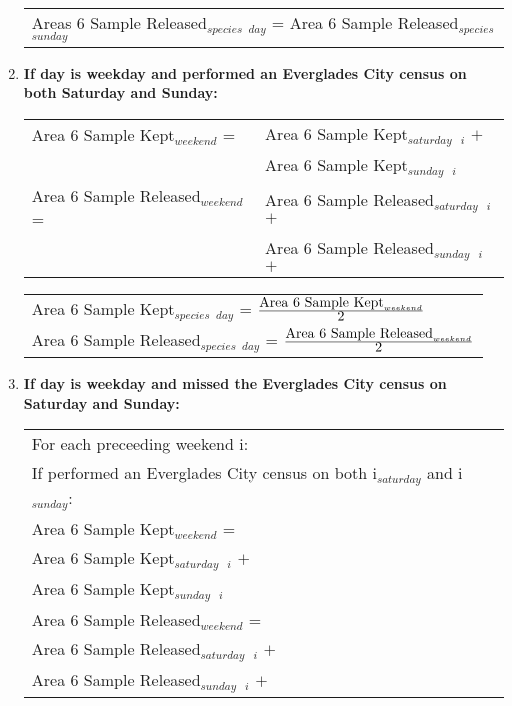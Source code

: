 \documentclass[letterpaper,12pt]{article}
\newcommand{\hspacer}{\hspace*{1cm}}
\newcommand{\fraction}[1]{\textrm{\normalsize{#1}}}
\begin{document}
\begin{enumerate}
\begin{tabular}{l@{ }}
	Areas 6 Sample Released$_{species}$ $_{day}$ =
		Area 6 Sample Released$_{species}$ $_{sunday}$
\end{tabular}

\item
\textbf{If day is weekday and performed an Everglades City census on both Saturday and Sunday:} \\
\begin{tabular}{l@{ }l@{ }}
	Area 6 Sample Kept$_{weekend}$ =
	& Area 6 Sample Kept$_{saturday}$\ $_{i}$ $+$ \\
	& Area 6 Sample Kept$_{sunday}$\ $_{i}$ \\

	Area 6 Sample Released$_{weekend}$ =
	& Area 6 Sample Released$_{saturday}$\ $_{i}$ $+$ \\
	& Area 6 Sample Released$_{sunday}$\ $_{i}$ $+$
\end{tabular}

\begin{tabular}{l@{ }}
	Area 6 Sample Kept$_{species}$ $_{day}$ =
		$
\frac
	{\fraction{Area 6 Sample Kept}_{weekend}}
      	{\fraction{2}}
		$ \\

	Area 6 Sample Released$_{species}$ $_{day}$ =
		$
\frac
	{\fraction{Area 6 Sample Released}_{weekend}}
      	{\fraction{2}}
		$
\end{tabular}

\item
\textbf{If day is weekday and missed the Everglades City census on Saturday and Sunday:} \\
\begin{tabular}{l@{ }l@{ }l}
	For each preceeding weekend i: \\
\hspacer If performed an Everglades City census on both i$_{saturday}$ and i$_{sunday}$: \\
\hspacer \hspacer	Area 6 Sample Kept$_{weekend}$ = \\
\hspacer \hspacer \hspacer Area 6 Sample Kept$_{saturday}$\ $_{i}$ $+$ \\
\hspacer \hspacer \hspacer Area 6 Sample Kept$_{sunday}$\ $_{i}$ \\

\hspacer \hspacer	Area 6 Sample Released$_{weekend}$ = \\
\hspacer \hspacer \hspacer Area 6 Sample Released$_{saturday}$\ $_{i}$ $+$ \\
\hspacer \hspacer \hspacer Area 6 Sample Released$_{sunday}$\ $_{i}$ $+$
\end{tabular}


\end{enumerate}
\end{document}
